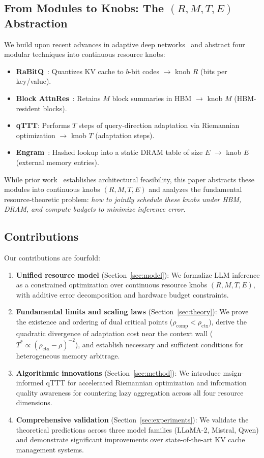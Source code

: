\documentclass[11pt,a4paper]{article}
\theoremstyle{plain}
\theoremstyle{definition}
\begin{document}
\subsection{From Modules to Knobs: The $(R,M,T,E)$ Abstraction}
We build upon recent advances in adaptive deep networks~\cite{adn2026} and abstract four modular techniques into continuous resource knobs:
\begin{itemize}
    \item \textbf{RaBitQ}~\cite{gao2024rabitq,gao2025rabitq}: Quantizes KV cache to $b$-bit codes $\rightarrow$ knob $R$ (bits per key/value).
    \item \textbf{Block AttnRes}~\cite{kimi2026}: Retains $M$ block summaries in HBM $\rightarrow$ knob $M$ (HBM-resident blocks).
    \item \textbf{qTTT}: Performs $T$ steps of query-direction adaptation via Riemannian optimization $\rightarrow$ knob $T$ (adaptation steps).
    \item \textbf{Engram}~\cite{cheng2026}: Hashed lookup into a static DRAM table of size $E$ $\rightarrow$ knob $E$ (external memory entries).
\end{itemize}
While prior work~\cite{adn2026} establishes architectural feasibility, this paper abstracts these modules into continuous knobs $(R,M,T,E)$ and analyzes the fundamental resource-theoretic problem: \textit{how to jointly schedule these knobs under HBM, DRAM, and compute budgets to minimize inference error}.

\subsection{Contributions}
Our contributions are fourfold:
\begin{enumerate}
    \item \textbf{Unified resource model} (Section~\ref{sec:model}): We formalize LLM inference as a constrained optimization over continuous resource knobs $(R,M,T,E)$, with additive error decomposition and hardware budget constraints.
    
    \item \textbf{Fundamental limits and scaling laws} (Section~\ref{sec:theory}): We prove the existence and ordering of dual critical points ($\rho_{\text{comp}} < \rho_{\text{ctx}}$), derive the quadratic divergence of adaptation cost near the context wall ($T^* \propto (\rho_{\text{ctx}}-\rho)^{-2}$), and establish necessary and sufficient conditions for heterogeneous memory arbitrage.
    
    \item \textbf{Algorithmic innovations} (Section~\ref{sec:method}): We introduce msign-informed qTTT for accelerated Riemannian optimization and information quality awareness for countering lazy aggregation across all four resource dimensions.
    
    \item \textbf{Comprehensive validation} (Section~\ref{sec:experiments}): We validate the theoretical predictions across three model families (LLaMA-2, Mistral, Qwen) and demonstrate significant improvements over state-of-the-art KV cache management systems.
\end{enumerate}
\end{document}
